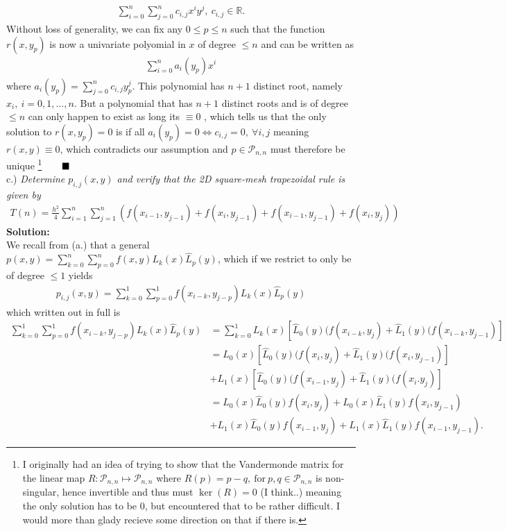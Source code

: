 \documentclass[12pt,
               a4paper,
               article,
               oneside,
               english,oldfontcommands]{memoir}
\newcommand{\Q}{ \qquad \hfill \blacksquare}
\newcommand{\spaze}{\vspace{4mm}\\}
\begin{document}
\begin{align*}
\sum_{i=0}^{n}\sum_{j=0}^{n} c_{i,j}x^{i}y^{j}, \ c_{i,j} \in \mathbb{R}.
\end{align*}
Without loss of generality, we can fix any $ 0 \leq p \leq n$ such that the function $r(x, y_p)$ is now a univariate polyomial in $x$ of degree $\leq n$ and can be written as
\begin{align*}
\sum_{i=0}^{n} a_{i}(y_p)x^{i}
\end{align*} 
where $  a_{i}(y_p) = \sum_{j=0}^{n} c_{i,j} y_{p}^{j}$.  This polynomial has $n+1$ distinct root, namely $x_i, \ i=0, 1, \ldots, n$. But a polynomial that has $n+1$ distinct roots and is of degree $\leq n$ can only happen to exist as long its $\equiv 0$ , which tells us that the only solution to $r(x, y_p) = 0 $ is if all $a_{i}(y_p) = 0 \iff c_{i,j} =0, \ \forall i,j$ meaning $r(x,y) \equiv 0$, which contradicts our assumption and $p \in \mathcal{P}_{n,n}$ must therefore be unique \footnote{I originally had an idea of trying to show that the Vandermonde matrix for the linear map $R: \mathcal{P}_{n, n} \mapsto \mathcal{P}_{n, n}$ where $R(p) = p - q, \ \text{for} \ p, q \in \mathcal{P}_{n,n}$ is non-singular, hence invertible and thus must $\ker(R) = 0 $ (I think..) meaning the only solution has to be $0$, but encountered that to be rather difficult. I would more than glady recieve some direction on that if there is.}$\Q$\spaze
c.) \emph{Determine $p_{i,j}(x,y)$ and verify that the 2D square-mesh trapezoidal rule is given by}
\begin{align*}
T(n) = \frac{h^2}{4}\sum_{i=1}^{n}\sum_{j=1}^{n} \left( f(x_{i-1}, y_{j-1}) + f(x_i, y_{j-1}) +  f(x_{i-1}, y_{j-1}) +  f(x_i, y_{j}) \right)
\end{align*}
\textbf{Solution:} \spaze
We recall from (a.) that a general $p(x,y) = \sum_{k = 0}^{n}  \sum_{p = 0}^{n} f(x, y) L_k(x) \hat{L}_{p}(y)$, which if we restrict to only be of degree $\leq 1$ yields \begin{align*}
p_{i,j}(x,y) = \sum_{k = 0}^{1}  \sum_{p = 0}^{1} f(x_{i -k}, y_{j - p}) L_k(x) \hat{L}_{p}(y)
\end{align*}
which written out in full is
\begin{align*}
\sum_{k = 0}^{1}  \sum_{p = 0}^{1} f(x_{i -k}, y_{j - p})  L_k(x) \hat{L}_{p}(y) &= \sum_{k = 0}^{1} L_{k}(x) \left[\hat{L}_{0}(y) (f(x_{i-k}, y_{j})+ \hat{L}_{1}(y) (f(x_{i-k}, y_{j-1}) \right] \\[5pt]
&= L_{0}(x) \left[\hat{L}_{0}(y) (f(x_{i}, y_{j})+ \hat{L}_{1}(y) (f(x_{i}, y_{j-1}) \right] \\[5pt]
&+ L_{1}(x) \left[\hat{L}_{0}(y) (f(x_{i-1}, y_{j})+ \hat{L}_{1}(y) (f(x_{i}. y_{j}) \right] \\[8pt]
&=   L_{0}(x) \hat{L}_{0}(y) f(x_{i}, y_{j}) +   L_{0}(x) \hat{L}_{1}(y) f(x_{i}, y_{j-1})\\[5pt]
&+  L_{1}(x) \hat{L}_{0}(y) f(x_{i-1}, y_{j})+ L_{1}(x)\hat{L}_{1}(y) f(x_{i-1}, y_{j-1}).
\end{align*}
\end{document}
